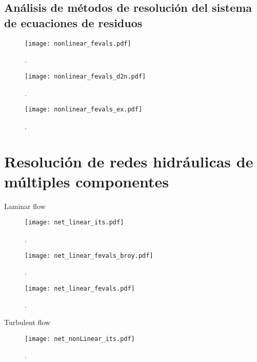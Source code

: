 \subsection*{Análisis de métodos de resolución del sistema de ecuaciones de residuos}



\begin{figure}[ht]
\centering
\texttt{[image: nonlinear\_fevals.pdf]}
\caption{.}  
	\label{nonlinear_fevals}
\end{figure}

\begin{figure}[ht]
\centering
\texttt{[image: nonlinear\_fevals\_d2n.pdf]}
\caption{.}  
	\label{nonlinear_fevals_d2n}
\end{figure}

\begin{figure}[ht]
\centering
\texttt{[image: nonlinear\_fevals\_ex.pdf]}
\caption{.}  
	\label{nonlinear_fevals_ex}
\end{figure}






\section{Resolución de redes hidráulicas de múltiples componentes}
\label{3:redes}

Laminar flow

\begin{figure}[ht]
\centering
\texttt{[image: net\_linear\_its.pdf]}
\caption{.}  
	\label{net_linear_its}
\end{figure}

\begin{figure}[ht]
\centering
\texttt{[image: net\_linear\_fevals\_broy.pdf]}
\caption{.}  
	\label{net_linear_fevals_broy}
\end{figure}

\begin{figure}[ht]
\centering
\texttt{[image: net\_linear\_fevals.pdf]}
\caption{.}  
	\label{net_linear_fevals}
\end{figure}


Turbulent flow

\begin{figure}[ht]
\centering
\texttt{[image: net\_nonLinear\_its.pdf]}
\caption{.}  
	\label{net_nonLinear_its}
\end{figure}

